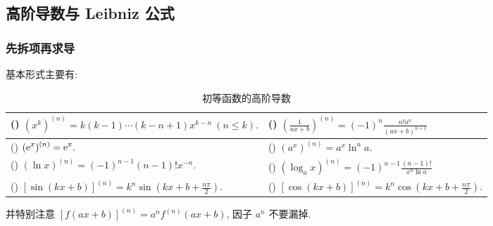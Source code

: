 \subsection{高阶导数与 Leibniz 公式}

\subsubsection{先拆项再求导}


基本形式主要有:

\setcounter{magicrownumbers}{0}
\begin{table}[H]
    \centering
    \caption{初等函数的高阶导数}
    \begin{tabular}{l l}
        (\rownumber{}) $\displaystyle (x^k)^{(n)}=k(k-1)\cdots(k-n+1)x^{k-n}~  (n\leqslant k).$    & (\rownumber{}) $\displaystyle \left(\frac{1}{ax+b}\right)^{(n)}=(-1)^n\frac{n!a^n}{(ax+b)^{n+1}}$ \\
        \midrule
        (\rownumber{}) $\displaystyle(\mathrm{e} ^x)^{(n)}=\mathrm{e} ^x.$                                         & (\rownumber{}) $\displaystyle (a^x)^{(n)}=a^x\ln^n a.$                                            \\
        (\rownumber{}) $\displaystyle(\ln x)^{(n)}=(-1)^{n-1}(n-1)!x^{-n}.$                        & (\rownumber{}) $\displaystyle(\log_ax)^{(n)}=(-1)^{n-1}\frac{(n-1)!}{x^n\ln a}$                   \\
        \midrule
        (\rownumber{}) $\displaystyle[\sin (kx+b)]^{(n)}=k^n\sin\left(kx+b+\frac{n\pi}{2}\right).$ & (\rownumber{}) $\displaystyle[\cos (kx+b)]^{(n)}=k^n\cos\left(kx+b+\frac{n\pi}{2}\right).$
    \end{tabular}
\end{table}
并特别注意 $[f(ax+b)]^{(n)}=a^nf^{(n)}(ax+b)$, 因子 $a^n$ 不要漏掉.

